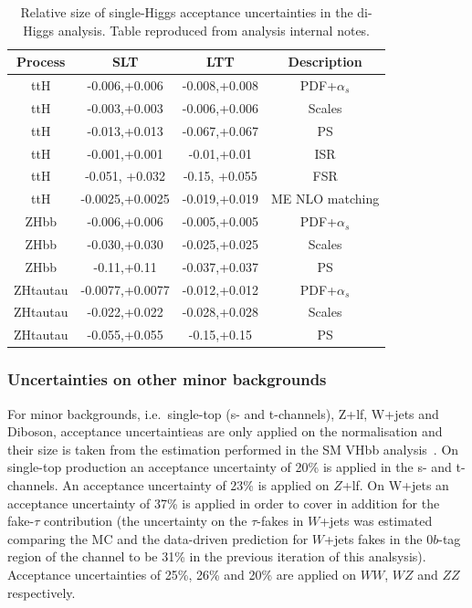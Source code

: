 \begin{table}
\centering
\small
\begin{tabular}{|c|c|c|c|}
\hline
Process   & SLT  & LTT  & Description\\
\hline
ttH  & -0.006,+0.006 & -0.008,+0.008   & PDF+$\alpha_s$ \\
ttH  & -0.003,+0.003 & -0.006,+0.006   & Scales\\
ttH  & -0.013,+0.013 & -0.067,+0.067  & PS\\
ttH  & -0.001,+0.001 & -0.01,+0.01  & ISR\\
ttH  & -0.051, +0.032 & -0.15, +0.055  & FSR\\
ttH  & -0.0025,+0.0025 & -0.019,+0.019  & ME NLO matching\\
ZHbb  & -0.006,+0.006 & -0.005,+0.005   & PDF+$\alpha_s$\\
ZHbb  & -0.030,+0.030 & -0.025,+0.025   & Scales\\
ZHbb  & -0.11,+0.11 & -0.037,+0.037   & PS\\
ZHtautau  & -0.0077,+0.0077 & -0.012,+0.012   & PDF+$\alpha_s$\\
ZHtautau  & -0.022,+0.022 & -0.028,+0.028   & Scales\\
ZHtautau  & -0.055,+0.055 & -0.15,+0.15   & PS\\
\hline
\end{tabular}
\caption{Relative size of single-Higgs acceptance uncertainties in the di-Higgs analysis.
Table reproduced from analysis internal notes.}
\label{sec:systs:tab:systematics_singleHiggs_AcceptanceNumbers}
\end{table}



\subsubsection{Uncertainties on other minor backgrounds}
\label{subsec:uncertainties_minor_bkgs}

For minor backgrounds, i.e.\ single-top (s- and t-channels), 
Z+lf, W+jets and Diboson, acceptance uncertaintieas are 
only applied on the normalisation and their size is taken from the 
estimation performed in the SM VHbb analysis~\cite{ATLAS-CONF-2020-006, AlKhoury:2690042}.  
On single-top production an acceptance uncertainty of 20\% is applied  
in the s- and t-channels. 
An acceptance uncertainty of 23\% is applied on $Z$+lf. 
On W+jets an acceptance uncertainty of 37\% is applied 
in order to cover in addition for the fake-$\tau$ contribution 
(the uncertainty on the $\tau$-fakes in $W$+jets was estimated comparing 
the MC and the data-driven prediction for $W$+jets fakes in the 
0$b$-tag region of the \lephad channel to be 31\% in the previous iteration of this analsysis). 
Acceptance uncertainties of 25\%, 26\% and 20\% are applied on $WW$, $WZ$ and $ZZ$ respectively.








